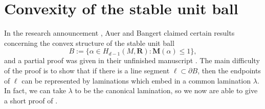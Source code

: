 \documentclass[reqno,11pt]{amsart}
\newcommand{\RR}{\mathbf{R}}
\newcommand*\dif{\mathop{}\!\mathrm{d}}
\newcommand{\weakto}{\rightharpoonup}
\newcommand{\vol}{\mathrm{vol}}
\newcommand{\Mass}{\mathbf M}
\newtheorem{proposition}[theorem]{Proposition}
\theoremstyle{definition}
\numberwithin{equation}{section}
\newcommand\todo[1]{\textcolor{red}{TODO: #1}}
\begin{document}







\section{Convexity of the stable unit ball}\label{convexity sec}
In the research announcement \cite{Auer01}, Auer and Bangert claimed certain results concerning the convex structure of the stable unit ball
$$B := \{\alpha \in H_{d - 1}(M, \RR): \Mass(\alpha) \leq 1\},$$
and a partial proof was given in their unfinished manuscript \cite{Auer12}.
The main difficulty of the proof is to show that if there is a line segment $\ell \subset \partial B$, then the endpoints of $\ell$ can be represented by laminations which embed in a common lamination $\lambda$.
In fact, we can take $\lambda$ to be the canonical lamination, so we now are able to give a short proof of \cite[Theorems 6 and 7]{Auer01}.
\end{document}
